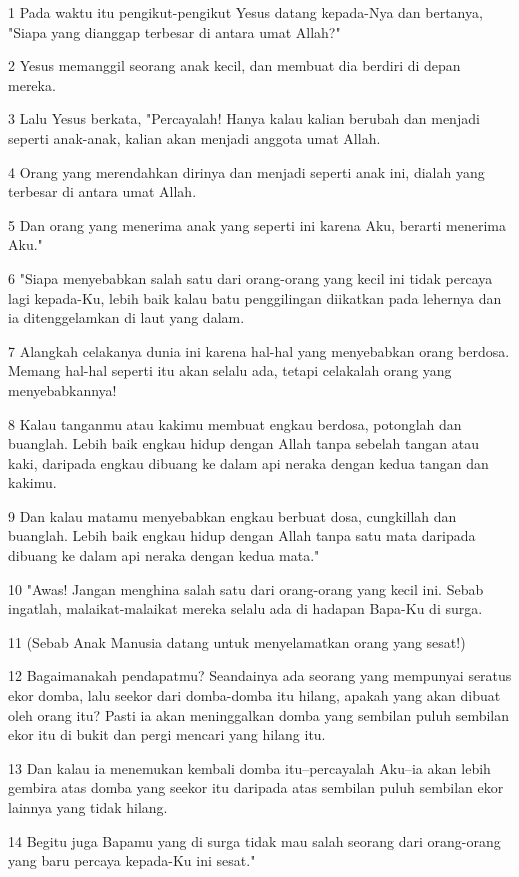 \par 1 Pada waktu itu pengikut-pengikut Yesus datang kepada-Nya dan bertanya, "Siapa yang dianggap terbesar di antara umat Allah?"
\par 2 Yesus memanggil seorang anak kecil, dan membuat dia berdiri di depan mereka.
\par 3 Lalu Yesus berkata, "Percayalah! Hanya kalau kalian berubah dan menjadi seperti anak-anak, kalian akan menjadi anggota umat Allah.
\par 4 Orang yang merendahkan dirinya dan menjadi seperti anak ini, dialah yang terbesar di antara umat Allah.
\par 5 Dan orang yang menerima anak yang seperti ini karena Aku, berarti menerima Aku."
\par 6 "Siapa menyebabkan salah satu dari orang-orang yang kecil ini tidak percaya lagi kepada-Ku, lebih baik kalau batu penggilingan diikatkan pada lehernya dan ia ditenggelamkan di laut yang dalam.
\par 7 Alangkah celakanya dunia ini karena hal-hal yang menyebabkan orang berdosa. Memang hal-hal seperti itu akan selalu ada, tetapi celakalah orang yang menyebabkannya!
\par 8 Kalau tanganmu atau kakimu membuat engkau berdosa, potonglah dan buanglah. Lebih baik engkau hidup dengan Allah tanpa sebelah tangan atau kaki, daripada engkau dibuang ke dalam api neraka dengan kedua tangan dan kakimu.
\par 9 Dan kalau matamu menyebabkan engkau berbuat dosa, cungkillah dan buanglah. Lebih baik engkau hidup dengan Allah tanpa satu mata daripada dibuang ke dalam api neraka dengan kedua mata."
\par 10 "Awas! Jangan menghina salah satu dari orang-orang yang kecil ini. Sebab ingatlah, malaikat-malaikat mereka selalu ada di hadapan Bapa-Ku di surga.
\par 11 (Sebab Anak Manusia datang untuk menyelamatkan orang yang sesat!)
\par 12 Bagaimanakah pendapatmu? Seandainya ada seorang yang mempunyai seratus ekor domba, lalu seekor dari domba-domba itu hilang, apakah yang akan dibuat oleh orang itu? Pasti ia akan meninggalkan domba yang sembilan puluh sembilan ekor itu di bukit dan pergi mencari yang hilang itu.
\par 13 Dan kalau ia menemukan kembali domba itu--percayalah Aku--ia akan lebih gembira atas domba yang seekor itu daripada atas sembilan puluh sembilan ekor lainnya yang tidak hilang.
\par 14 Begitu juga Bapamu yang di surga tidak mau salah seorang dari orang-orang yang baru percaya kepada-Ku ini sesat."
